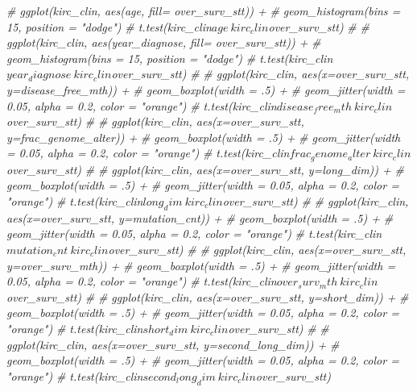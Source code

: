 \documentclass[]{article}
\newenvironment{Shaded}{\begin{snugshade}}{\end{snugshade}}
\newcommand{\CommentTok}[1]{\textcolor[rgb]{0.56,0.35,0.01}{\textit{#1}}}
\begin{document}
\begin{Shaded}
\begin{Highlighting}[]
\CommentTok{# ggplot(kirc_clin, aes(age, fill= over_surv_stt)) +}
\CommentTok{#   geom_histogram(bins = 15, position = "dodge")}
\CommentTok{# t.test(kirc_clin$age ~ kirc_clin$over_surv_stt) }
\CommentTok{# }
\CommentTok{# ggplot(kirc_clin, aes(year_diagnose, fill= over_surv_stt)) +}
\CommentTok{#   geom_histogram(bins = 15, position = "dodge")}
\CommentTok{# t.test(kirc_clin$year_diagnose ~ kirc_clin$over_surv_stt) }
\CommentTok{# }
\CommentTok{# ggplot(kirc_clin, aes(x=over_surv_stt, y=disease_free_mth)) +}
\CommentTok{#   geom_boxplot(width = .5) +}
\CommentTok{#   geom_jitter(width = 0.05, alpha = 0.2, color = "orange")}
\CommentTok{# t.test(kirc_clin$disease_free_mth ~ kirc_clin$over_surv_stt)}
\CommentTok{# }
\CommentTok{# ggplot(kirc_clin, aes(x=over_surv_stt, y=frac_genome_alter)) +}
\CommentTok{#   geom_boxplot(width = .5) +}
\CommentTok{#   geom_jitter(width = 0.05, alpha = 0.2, color = "orange")}
\CommentTok{# t.test(kirc_clin$frac_genome_alter ~ kirc_clin$over_surv_stt)}
\CommentTok{# }
\CommentTok{# ggplot(kirc_clin, aes(x=over_surv_stt, y=long_dim)) +}
\CommentTok{#   geom_boxplot(width = .5) +}
\CommentTok{#   geom_jitter(width = 0.05, alpha = 0.2, color = "orange")}
\CommentTok{# t.test(kirc_clin$long_dim ~ kirc_clin$over_surv_stt)}
\CommentTok{# }
\CommentTok{# ggplot(kirc_clin, aes(x=over_surv_stt, y=mutation_cnt)) +}
\CommentTok{#   geom_boxplot(width = .5) +}
\CommentTok{#   geom_jitter(width = 0.05, alpha = 0.2, color = "orange")}
\CommentTok{# t.test(kirc_clin$mutation_cnt ~ kirc_clin$over_surv_stt)}
\CommentTok{# }
\CommentTok{# ggplot(kirc_clin, aes(x=over_surv_stt, y=over_surv_mth)) +}
\CommentTok{#   geom_boxplot(width = .5) +}
\CommentTok{#   geom_jitter(width = 0.05, alpha = 0.2, color = "orange")}
\CommentTok{# t.test(kirc_clin$over_surv_mth ~ kirc_clin$over_surv_stt)}
\CommentTok{# }
\CommentTok{# ggplot(kirc_clin, aes(x=over_surv_stt, y=short_dim)) +}
\CommentTok{#   geom_boxplot(width = .5) +}
\CommentTok{#   geom_jitter(width = 0.05, alpha = 0.2, color = "orange")}
\CommentTok{# t.test(kirc_clin$short_dim ~ kirc_clin$over_surv_stt)}
\CommentTok{# }
\CommentTok{# ggplot(kirc_clin, aes(x=over_surv_stt, y=second_long_dim)) +}
\CommentTok{#   geom_boxplot(width = .5) +}
\CommentTok{#   geom_jitter(width = 0.05, alpha = 0.2, color = "orange")}
\CommentTok{# t.test(kirc_clin$second_long_dim ~ kirc_clin$over_surv_stt)}
\end{Highlighting}
\end{Shaded}
\end{document}
